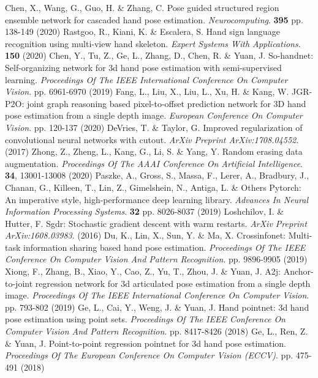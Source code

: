 \documentclass{article}
\begin{document}
\begin{thebibliography}{00}
Chen, X., Wang, G., Guo, H. \& Zhang, C. Pose guided structured region ensemble network for cascaded hand pose estimation. {\em Neurocomputing}. \textbf{395} pp. 138-149 (2020)
Rastgoo, R., Kiani, K. \& Escalera, S. Hand sign language recognition using multi-view hand skeleton. {\em Expert Systems With Applications}. \textbf{150} (2020)
Chen, Y., Tu, Z., Ge, L., Zhang, D., Chen, R. \& Yuan, J. So-handnet: Self-organizing network for 3d hand pose estimation with semi-supervised learning. {\em Proceedings Of The IEEE International Conference On Computer Vision}. pp. 6961-6970 (2019)
Fang, L., Liu, X., Liu, L., Xu, H. \& Kang, W. JGR-P2O: joint graph reasoning based pixel-to-offset prediction network for 3D hand pose estimation from a single depth image. {\em European Conference On Computer Vision}. pp. 120-137 (2020)
DeVries, T. \& Taylor, G. Improved regularization of convolutional neural networks with cutout. {\em ArXiv Preprint ArXiv:1708.04552}. (2017)
Zhong, Z., Zheng, L., Kang, G., Li, S. \& Yang, Y. Random erasing data augmentation. {\em Proceedings Of The AAAI Conference On Artificial Intelligence}. \textbf{34}, 13001-13008 (2020)
Paszke, A., Gross, S., Massa, F., Lerer, A., Bradbury, J., Chanan, G., Killeen, T., Lin, Z., Gimelshein, N., Antiga, L. \& Others Pytorch: An imperative style, high-performance deep learning library. {\em Advances In Neural Information Processing Systems}. \textbf{32} pp. 8026-8037 (2019)
Loshchilov, I. \& Hutter, F. Sgdr: Stochastic gradient descent with warm restarts. {\em ArXiv Preprint ArXiv:1608.03983}. (2016)
Du, K., Lin, X., Sun, Y. \& Ma, X. Crossinfonet: Multi-task information sharing based hand pose estimation. {\em Proceedings Of The IEEE Conference On Computer Vision And Pattern Recognition}. pp. 9896-9905 (2019)
Xiong, F., Zhang, B., Xiao, Y., Cao, Z., Yu, T., Zhou, J. \& Yuan, J. A2j: Anchor-to-joint regression network for 3d articulated pose estimation from a single depth image. {\em Proceedings Of The IEEE International Conference On Computer Vision}. pp. 793-802 (2019)
Ge, L., Cai, Y., Weng, J. \& Yuan, J. Hand pointnet: 3d hand pose estimation using point sets. {\em Proceedings Of The IEEE Conference On Computer Vision And Pattern Recognition}. pp. 8417-8426 (2018)
Ge, L., Ren, Z. \& Yuan, J. Point-to-point regression pointnet for 3d hand pose estimation. {\em Proceedings Of The European Conference On Computer Vision (ECCV)}. pp. 475-491 (2018)

\end{thebibliography}
\end{document}
